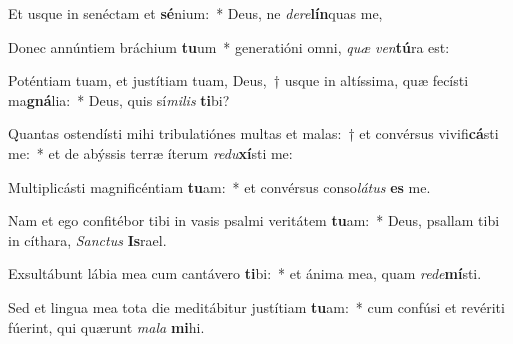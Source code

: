 \item Et usque in senéctam et \textbf{sé}nium:~* Deus, ne \textit{dere}\textbf{lín}quas me,
\item Donec annúntiem bráchium \textbf{tu}um~* generatióni omni, \textit{quæ} \textit{ven}\textbf{tú}ra est:
\item Poténtiam tuam, et justítiam tuam, Deus,~† usque in altíssima, quæ fecísti ma\textbf{gná}lia:~* Deus, quis sí\textit{milis} \textbf{ti}bi?
\item Quantas ostendísti mihi tribulatiónes multas et malas:~† et convérsus vivifi\textbf{cá}sti me:~* et de abýssis terræ íterum \textit{redu}\textbf{xí}sti me:
\item Multiplicásti magnificéntiam \textbf{tu}am:~* et convérsus conso\textit{látus} \textbf{es} me.
\item Nam et ego confitébor tibi in vasis psalmi veritátem \textbf{tu}am:~* Deus, psallam tibi in cíthara, \textit{San\-ctus} \textbf{Is}rael.
\item Exsultábunt lábia mea cum cantávero \textbf{ti}bi:~* et ánima mea, quam \textit{rede}\textbf{mí}sti.
\item Sed et lingua mea tota die meditábitur ju\-stítiam \textbf{tu}am:~* cum confúsi et revériti fúerint, qui quærunt \textit{mala} \textbf{mi}hi.
